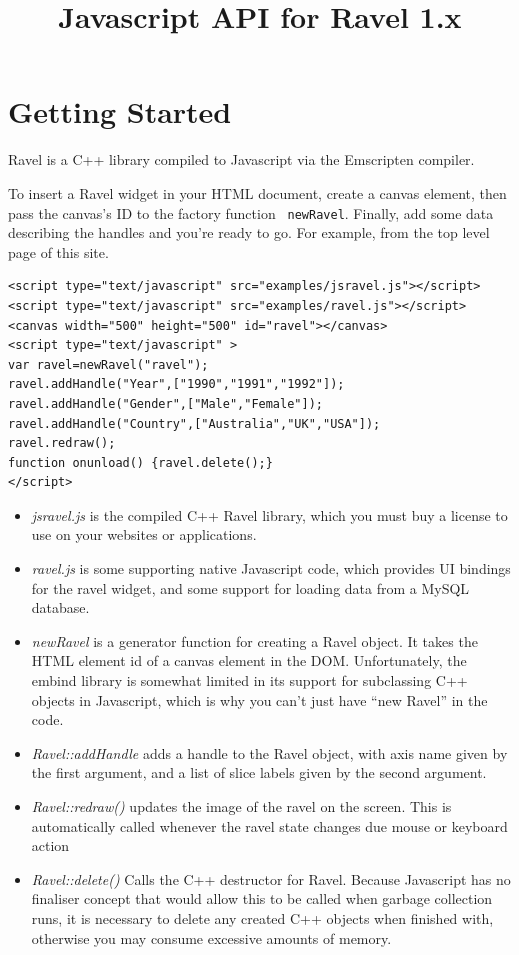 \documentclass{article}
\title{Javascript API for Ravel 1.x}
\begin{document}
\section{Getting Started}
Ravel is a C++ library compiled to Javascript via the Emscripten
compiler.

To insert a Ravel widget in your HTML document, create a
canvas element, then pass the canvas's ID to the factory function {\tt
  newRavel}. Finally, add some data describing the handles and you're
ready to go. For example, from the top level page of this site.

\begin{verbatim}
<script type="text/javascript" src="examples/jsravel.js"></script>
<script type="text/javascript" src="examples/ravel.js"></script>
<canvas width="500" height="500" id="ravel"></canvas>
<script type="text/javascript" >
var ravel=newRavel("ravel");
ravel.addHandle("Year",["1990","1991","1992"]);
ravel.addHandle("Gender",["Male","Female"]);
ravel.addHandle("Country",["Australia","UK","USA"]);
ravel.redraw();
function onunload() {ravel.delete();}
</script>
\end{verbatim}

\begin{itemize}
\item {\em jsravel.js} is the compiled C++ Ravel library, which you must buy
a license to use on your websites or applications.

\item {\em ravel.js} is some supporting native Javascript code, which
provides UI bindings for the ravel widget, and some support for
loading data from a MySQL database.

\item {\em newRavel} is a generator function for creating a Ravel
  object. It takes the HTML element id of a canvas element in the DOM.  
  Unfortunately, the embind library is somewhat limited in its support
  for subclassing C++ objects in Javascript, which is why you can't
  just have ``new Ravel'' in the code.

\item {\em Ravel::addHandle} adds a handle to the Ravel object, with axis name
  given by the first argument, and a list of slice labels given by the
  second argument.

\item {\em Ravel::redraw()} updates the image of the ravel on the
  screen. This is automatically called whenever the ravel state
  changes due mouse or keyboard action

\item {\em Ravel::delete()} Calls the C++ destructor for
  Ravel. Because Javascript has no finaliser concept that would allow
  this to be called when garbage collection runs, it is necessary
  to delete any created C++ objects when finished with, otherwise you
  may consume excessive amounts of memory.
\end{itemize}
\end{document}
